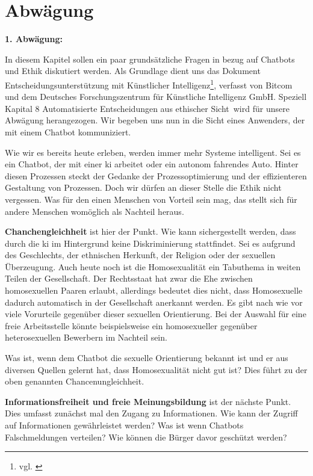 \section{Abwägung}
\textbf{1. Abwägung:}

In diesem Kapitel sollen ein paar grundsätzliche Fragen in bezug auf Chatbots und Ethik diskutiert werden. 
Als Grundlage dient uns das Dokument \glqq Entscheidungsunterstützung mit Künstlicher Intelligenz\grqq\footnote{vgl. \cite{Bitkom}}, verfasst von Bitcom und dem Deutsches Forschungszentrum für Künstliche Intelligenz GmbH. 
Speziell Kapital 8 \glqq Automatisierte Entscheidungen aus ethischer Sicht\grqq\ wird für unsere Abwägung herangezogen. 
Wir begeben uns nun in die Sicht eines Anwenders, der mit einem Chatbot kommuniziert. 

Wie wir es bereits heute erleben, werden immer mehr Systeme \glqq intelligent\grqq. 
Sei es ein Chatbot, der mit einer \ac{ki} arbeitet oder ein autonom fahrendes Auto. 
Hinter diesen Prozessen steckt der Gedanke der Prozessoptimierung und der effizienteren Gestaltung von Prozessen. 
Doch wir dürfen an dieser Stelle die Ethik nicht vergessen. 
Was für den einen Menschen von Vorteil sein mag, das stellt sich für andere Menschen womöglich als Nachteil heraus.

\textbf{Chanchengleichheit} ist hier der Punkt. Wie kann sichergestellt werden, dass durch die \ac{ki} im Hintergrund keine Diskriminierung stattfindet. Sei es aufgrund des Geschlechts, der ethnischen Herkunft, der Religion oder der sexuellen Überzeugung. Auch heute noch ist die Homosexualität ein Tabuthema in weiten Teilen der Gesellschaft. 
Der Rechtsstaat hat zwar die Ehe zwischen homosexuellen Paaren erlaubt, allerdings bedeutet dies nicht, dass Homosexuelle dadurch automatisch in der Gesellschaft anerkannt werden. 
Es gibt nach wie vor viele Vorurteile gegenüber dieser sexuellen Orientierung. 
Bei der Auswahl für eine freie Arbeitsstelle könnte beispielsweise ein homosexueller gegenüber heterosexuellen Bewerbern im Nachteil sein.

Was ist, wenn dem Chatbot die sexuelle Orientierung bekannt ist und er aus diversen Quellen gelernt hat, dass Homosexualität nicht gut ist? 
Dies führt zu der oben genannten Chancenungleichheit. 

\textbf{Informationsfreiheit und freie Meinungsbildung} ist der nächste Punkt. Dies umfasst zunächst mal den Zugang zu Informationen.
Wie kann der Zugriff auf Informationen gewährleistet werden? Was ist wenn Chatbots Falschmeldungen verteilen? Wie können die Bürger davor geschützt werden?

